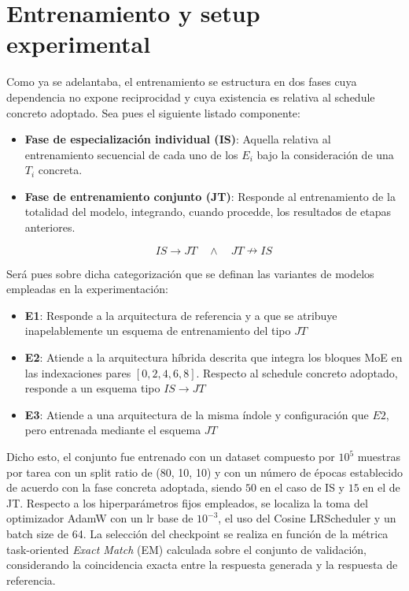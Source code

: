 \documentclass[10pt,twocolumn,a4paper]{article}
\begin{document}
\section{Entrenamiento y setup experimental}
\label{sec:train_n_setup}
Como ya se adelantaba, el entrenamiento se estructura en dos fases cuya dependencia no expone reciprocidad y cuya existencia es relativa al schedule concreto adoptado. Sea pues el siguiente listado componente:

\begin{itemize}

\item{\textbf{Fase de especialización individual (IS)}}:
Aquella relativa al entrenamiento secuencial de cada uno de los $E_i$ bajo la consideración de una $T_i$ concreta.

\item{\textbf{Fase de entrenamiento conjunto (JT)}}:
Responde al entrenamiento de la totalidad del modelo, integrando, cuando procedde, los resultados de etapas anteriores.

    $$IS\rightarrow JT \quad \land \quad JT\nrightarrow IS$$


\end{itemize}

Será pues sobre dicha categorización que se definan las variantes de modelos empleadas en la experimentación:

\begin{itemize}

\item{\textbf{E1}}:
    Responde a la arquitectura de referencia y a que  se atribuye inapelablemente un esquema de entrenamiento del tipo $JT $

\item{\textbf{E2}}:
    Atiende a la arquitectura híbrida descrita que integra los bloques MoE en las indexaciones pares $[0, 2, 4, 6, 8]$. Respecto al schedule concreto adoptado, responde a un esquema tipo $IS\rightarrow JT \quad$

\item{\textbf{E3}}:     Atiende a una arquitectura de la misma índole y configuración que $E2$, pero entrenada mediante el esquema $JT\quad$

\end{itemize}

Dicho esto, el conjunto fue entrenado con un dataset compuesto por
$10^5$ muestras por tarea con un split ratio de (80, 10, 10) y con
un número de épocas establecido de acuerdo con la fase concreta
adoptada, siendo $50$ en el caso de IS y $15$ en el de JT. Respecto
a los hiperparámetros fijos empleados, se localiza la toma del
optimizador AdamW con un lr base de $10^{-3}$, el uso del Cosine
LRScheduler y un batch size de 64. La selección del checkpoint se
realiza en función de la métrica task-oriented \emph{Exact Match} (EM) calculada
sobre el conjunto de validación, considerando la coincidencia exacta
entre la respuesta generada y la respuesta de referencia.
\end{document}
